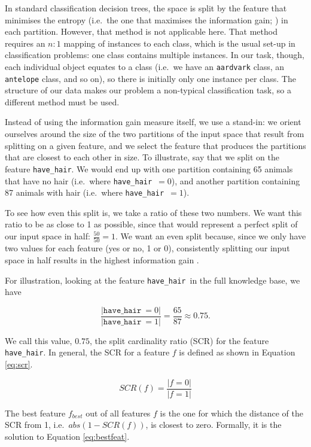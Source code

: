 \documentclass[11pt,a4paper]{article}
\newcommand{\havehair}{\texttt{have\_hair}}
\begin{document}
In standard classification decision trees, the space is split by the feature that minimises the entropy (i.e.\ the one that maximises the information gain; \citealt{Quinlan1986}) in each partition.
However, that method is not applicable here.
That method requires an $n : 1$ mapping of instances to each class, which is the usual set-up in classification problems: one class contains multiple instances.
In our task, though, each individual object equates to a class (i.e.\ we have an \texttt{aardvark} class, an \texttt{antelope} class, and so on), so there is initially only one instance per class.
The structure of our data makes our problem a non-typical classification task, so a different method must be used.

Instead of using the information gain measure itself, we use a stand-in: we orient ourselves around the size of the two partitions of the input space that result from splitting on a given feature, and we select the feature that produces the partitions that are closest to each other in size.
To illustrate, say that we split on the feature \havehair.
We would end up with one partition containing 65 animals that have no hair (i.e.\ where \havehair\ $= 0$), and another partition containing 87 animals with hair (i.e.\ where \havehair\ $= 1$).

To see how even this split is, we take a ratio of these two numbers.
We want this ratio to be as close to 1 as possible, since that would represent a perfect split of our input space in half: $\frac{50}{50} = 1$.
We want an even split because, since we only have two values for each feature (yes or no, 1 or 0), consistently splitting our input space in half results in the highest information gain \citep[cf.][]{Quinlan1986, Bishop2006}.

For illustration, looking at the feature \havehair\ in the full knowledge base, we have

$$\frac{|\havehair\ = 0|}{|\havehair\ = 1|} = \frac{65}{87} \approx 0.75.$$

We call this value, $0.75$, the split cardinality ratio (SCR) for the feature \havehair.
In general, the SCR for a feature $f$ is defined as shown in Equation \ref{eq:scr}.

\begin{equation}
SCR(f) = \frac{|f = 0|}{|f = 1|} 
\label{eq:scr}
\end{equation}

The best feature $f_{best}$ out of all features $f$ is the one for which the distance of the SCR from 1, i.e.\ $abs(1 - SCR(f))$, is closest to zero.
Formally, it is the solution to Equation \ref{eq:bestfeat}.
\end{document}
